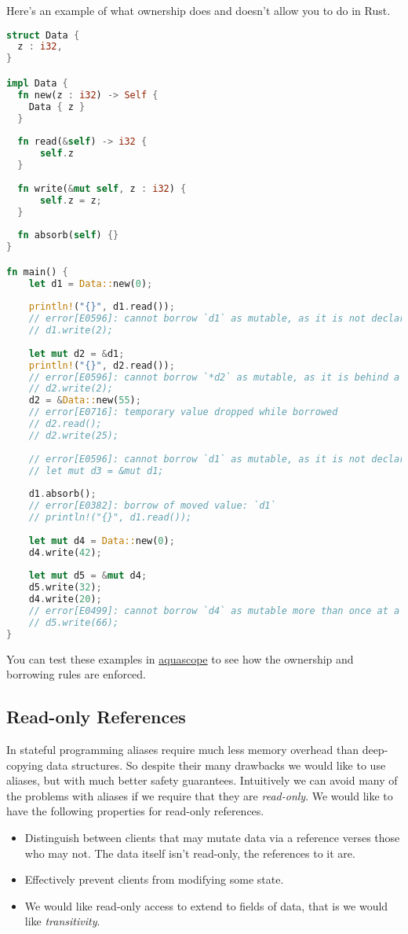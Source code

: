 \documentclass{article}
\begin{document}
\begin{example}
  Here's an example of what ownership does and doesn't allow you to do in Rust.
\begin{lstlisting}[escapechar=|, language=Rust]
struct Data {
  z : i32,
}

impl Data {
  fn new(z : i32) -> Self {
    Data { z }
  }
  
  fn read(&self) -> i32 {
      self.z
  }
  
  fn write(&mut self, z : i32) {
      self.z = z;
  }
  
  fn absorb(self) {}
}

fn main() {
    let d1 = Data::new(0);
  
    println!("{}", d1.read());
    // error[E0596]: cannot borrow `d1` as mutable, as it is not declared as mutable
    // d1.write(2);
  
    let mut d2 = &d1;
    println!("{}", d2.read());
    // error[E0596]: cannot borrow `*d2` as mutable, as it is behind a `&` reference
    // d2.write(2);
    d2 = &Data::new(55);
    // error[E0716]: temporary value dropped while borrowed
    // d2.read();
    // d2.write(25);
    
    // error[E0596]: cannot borrow `d1` as mutable, as it is not declared as mutable
    // let mut d3 = &mut d1;
  
    d1.absorb();
    // error[E0382]: borrow of moved value: `d1`
    // println!("{}", d1.read());
    
    let mut d4 = Data::new(0);
    d4.write(42);
    
    let mut d5 = &mut d4;
    d5.write(32);
    d4.write(20);
    // error[E0499]: cannot borrow `d4` as mutable more than once at a time
    // d5.write(66);
}
\end{lstlisting}
  You can test these examples in \href{https://cognitive-engineering-lab.github.io/aquascope/}{aquascope} to see how the ownership and borrowing rules are enforced.
\end{example}

\subsection{Read-only References}

In stateful programming aliases require much less memory overhead than deep-copying data structures.
So despite their many drawbacks we would like to use aliases, but with much better safety guarantees.
Intuitively we can avoid many of the problems with aliases if we require that they are \textit{read-only}.
We would like to have the following properties for read-only references.
\begin{itemize}
\item Distinguish between clients that may mutate data via a reference verses those who may not. The data itself isn't read-only, the references to it are.
\item Effectively prevent clients from modifying some state.
\item We would like read-only access to extend to fields of data, that is we would like \textit{transitivity}.
\end{itemize}
\end{document}
